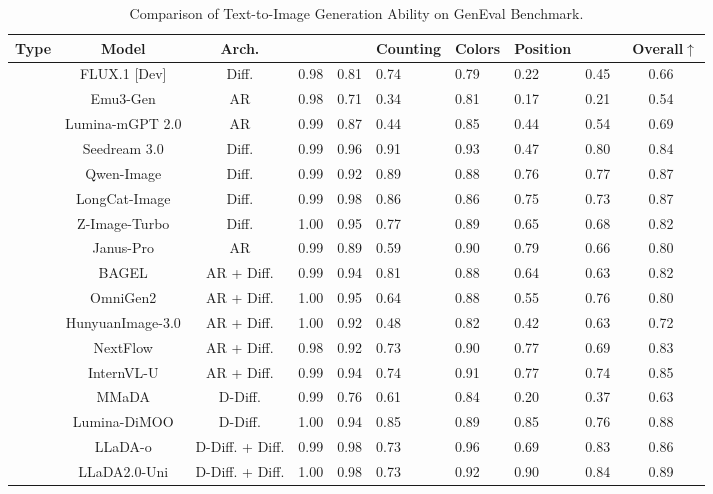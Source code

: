 \begin{table}[!tb]
\centering
\renewcommand{\arraystretch}{1.2}
\setlength\tabcolsep{1.5pt} 
\small
{}

\caption{Comparison of Text-to-Image Generation Ability on GenEval Benchmark.}
\begin{tabularx}{\linewidth}{ccc| *{6}{C}|c} 
\toprule
\textbf{Type} & \textbf{Model} &\textbf{Arch.} &\textbf{} & \textbf{} & \textbf{Counting} & \textbf{Colors} & \textbf{Position} & \textbf{}& \textbf{~Overall$\uparrow$} \\
\midrule
{} 
& FLUX.1 [Dev] & Diff. & 0.98& 0.81 & 0.74& 0.79& 0.22& 0.45 &0.66 \\
& Emu3-Gen & AR & 0.98 & 0.71 & 0.34 & 0.81 & 0.17 & 0.21 & 0.54 \\
& Lumina-mGPT 2.0 &AR &0.99 &0.87 &0.44 &0.85 &0.44 &0.54 &0.69\\
& Seedream 3.0 &Diff. &0.99 &0.96 &0.91 &0.93 &0.47 &0.80 &0.84 \\
&Qwen-Image &Diff. &0.99 &0.92 &0.89 &0.88 &0.76 &0.77 &0.87 \\
&LongCat-Image &Diff. &0.99 &0.98 &0.86 &0.86 &0.75 &0.73 &0.87\\
&Z-Image-Turbo &Diff. &1.00 &0.95 &0.77 &0.89 &0.65 &0.68 &0.82 \\

\midrule
{} 
& Janus-Pro & AR & 0.99 & 0.89 & 0.59 & 0.90 & 0.79 & 0.66 & 0.80 \\
& BAGEL & AR + Diff. & 0.99 & 0.94 & 0.81 & 0.88 & 0.64 & 0.63 & 0.82 \\
& OmniGen2 & AR + Diff. &1.00 &0.95 &0.64 &0.88 &0.55 &0.76 &0.80 \\
& HunyuanImage-3.0 & AR + Diff. &1.00 &0.92 &0.48 &0.82 &0.42 &0.63 &0.72\\
& NextFlow & AR + Diff. &0.98 &0.92 &0.73 &0.90 &0.77 &0.69 &0.83 \\
& InternVL-U & AR + Diff. & 0.99 & 0.94 & 0.74 & 0.91 & 0.77 & 0.74 & 0.85 \\
& MMaDA & D-Diff. & 0.99 & 0.76 & 0.61 & 0.84 & 0.20 & 0.37 & 0.63 \\
& Lumina-DiMOO & D-Diff. &1.00 &0.94 &0.85 &0.89 &0.85 &0.76 &0.88 \\
& LLaDA-o & D-Diff. + Diff. &0.99 &0.98 &0.73 &0.96 &0.69 &0.83 &0.86 \\
& LLaDA2.0-Uni & D-Diff. + Diff. &1.00 & 0.98 & 0.73  & 0.92 & 0.90 & 0.84 & 0.89 \\
\bottomrule
\end{tabularx}
\label{table:geneval}
\vspace{-0.06in}
\end{table}
